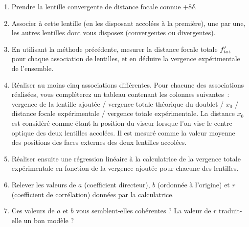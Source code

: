 \documentclass[a4paper, 12pt, final, garamond]{book}
\begin{document}
\begin{enumerate}

    \item  Prendre la lentille convergente de distance focale connue $+8\delta$. 
    
    \item  Associer à cette lentille (en les disposant accolées à la première),
        une par une, les autres lentilles dont vous disposez (convergentes ou
        divergentes). 
    
    \item  En utilisant la méthode précédente, mesurer la distance focale totale
        $f'_{\rm tot}$ pour chaque association de lentilles, et en déduire la
        vergence expérimentale de l'ensemble.
    
    \item  Réaliser au moins cinq associations différentes. Pour chacune des
        associations réalisées, vous compléterez un tableau contenant les
        colonnes suivantes~: vergence de la lentille ajoutée / vergence totale
        théorique du doublet / $x_0$ / distance focale expérimentale / vergence
        totale expérimentale. La distance $x_0$ est considéré comme étant la
        position du viseur lorsque l'on vise le centre optique des deux
        lentilles accolées. Il est mesuré comme la valeur moyenne des positions
        des faces externes des deux lentilles accolées. 
    
    \item  Réaliser ensuite une régression linéaire à la calculatrice de la
        vergence totale expérimentale en fonction de la vergence ajoutée pour
        chacune des lentilles. 
    
    \item  Relever les valeurs de $a$ (coefficient directeur), $b$ (ordonnée à
        l'origine) et $r$ (coefficient de corrélation) données par la
        calculatrice.
    
    \item  Ces valeurs de $a$ et $b$ vous semblent-elles cohérentes ? La valeur
        de $r$ traduit-elle un bon modèle ?
\end{enumerate}
\end{document}

